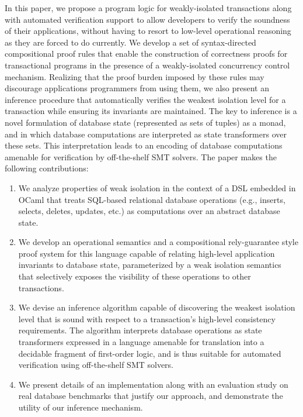 In this paper, we propose a program logic for weakly-isolated
transactions along with automated verification support to allow
developers to verify the soundness of their applications, without
having to resort to low-level operational reasoning as they are forced
to do currently.  We develop a set of syntax-directed compositional
proof rules that enable the construction of correctness proofs for
transactional programs in the presence of a weakly-isolated
concurrency control mechanism.  Realizing that the proof burden
imposed by these rules may discourage applications programmers from
using them, we also present an inference procedure that automatically
verifies the weakest isolation level for a transaction while ensuring
its invariants are maintained.  The key to inference is a novel
formulation of database state (represented as sets of tuples) as a
monad, and in which database computations are interpreted as state
transformers over these sets.  This interpretation leads to an
encoding of database computations amenable for verification by
off-the-shelf SMT solvers.  The paper makes the following
contributions:
\begin{enumerate}
  \item We analyze properties of weak isolation in the context of a
    DSL embedded in OCaml that treats SQL-based relational database
    operations (e.g., inserts, selects, deletes, updates, etc.) as
    computations over an abstract database state.
  \item We develop an operational semantics and a compositional
    rely-guarantee style proof system for this language capable of
    relating high-level application invariants to database state,
    parameterized by a weak isolation semantics that selectively
    exposes the visibility of these operations to other transactions.
  \item We devise an inference algorithm capable of discovering the
    weakest isolation level that is sound with respect to a
    transaction's high-level consistency requirements. The algorithm
    interprets database operations as state transformers expressed in
    a language amenable for translation into a decidable fragment of
    first-order logic, and is thus suitable for automated verification
    using off-the-shelf SMT solvers.
  \item We present details of an implementation along with an
    evaluation study on real database benchmarks that justify our
    approach, and demonstrate the utility of our inference mechanism.
\end{enumerate}
